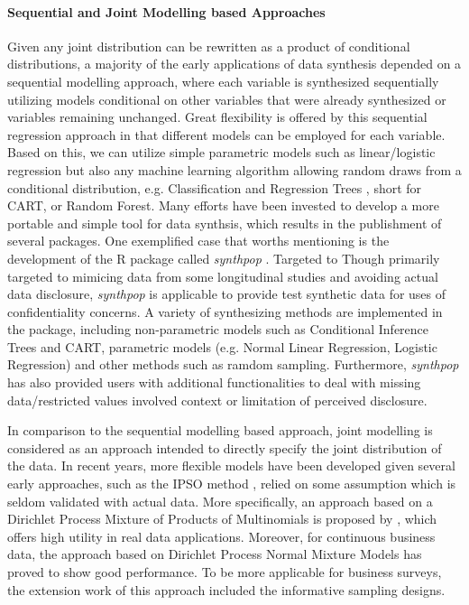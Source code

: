 \paragraph{Sequential and Joint Modelling based Approaches}
Given any joint distribution can be rewritten as a product of conditional distributions, a majority of the early applications of data synthesis depended on a sequential modelling approach, where each 
variable is synthesized sequentially utilizing models conditional on other variables that were already synthesized or variables remaining 
unchanged. Great flexibility is offered by this sequential regression approach in that different models can be employed for each variable.
Based on this, we can utilize simple parametric models such as linear/logistic regression but also any machine learning algorithm allowing random
draws from a conditional distribution, e.g. Classification and Regression Trees \citep{loh2011classification}, short for CART, or Random Forest. Many efforts have been invested to develop a more portable and simple tool for
data synthsis, which results in the publishment of several packages. One exemplified case that worths mentioning is the development of the R package called \textit{synthpop} \citep{nowok2016synthpop}. Targeted to 
Though primarily targeted to mimicing data from some longitudinal studies and avoiding actual data disclosure, \textit{synthpop} is applicable to provide test synthetic data
for uses of confidentiality concerns. A variety of synthesizing methods are implemented in the package, including non-parametric models such as Conditional Inference Trees \citep{hothorn2015ctree} and CART, 
parametric models (e.g. Normal Linear Regression, Logistic Regression) and other methods such as ramdom sampling. Furthermore, \textit{synthpop} has also provided users with additional functionalities to deal with
missing data/restricted values involved context or limitation of perceived disclosure.

In comparison to the sequential modelling based approach, joint modelling is considered as an approach intended to directly specify the joint distribution of the data. In recent years, more flexible models have been developed
given several early approaches, such as the IPSO method \citep{burridge2003information}, relied on some assumption which is seldom validated with actual data. More specifically, an approach based on a Dirichlet Process 
Mixture of Products of Multinomials is proposed by \citet{hu2014disclosure}, which offers high utility in real data applications. Moreover, for continuous business data, the approach based on Dirichlet
Process Normal Mixture Models \citep{kim2018simultaneous} has proved to show good performance. To be more applicable for business surveys, the extension work of this approach \citep{kim2021synthetic} included the informative sampling designs.

